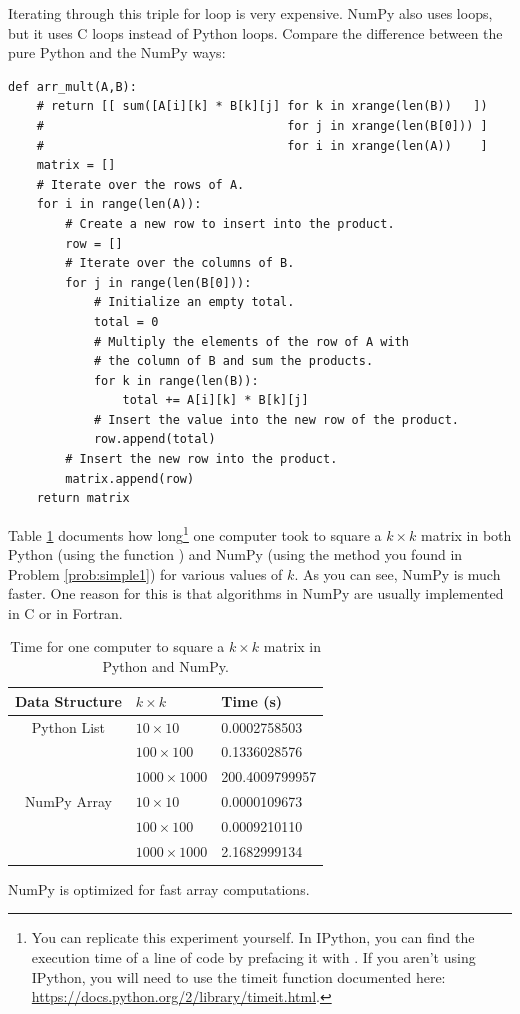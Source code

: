 Iterating through this triple for loop is very expensive.
NumPy also uses loops, but it uses C loops instead of Python loops.
Compare the difference between the pure Python and the NumPy ways:

\begin{lstlisting}
def arr_mult(A,B):
    # return [[ sum([A[i][k] * B[k][j] for k in xrange(len(B))   ]) 
    #                                  for j in xrange(len(B[0])) ]
    #                                  for i in xrange(len(A))    ]
    matrix = []
    # Iterate over the rows of A.
    for i in range(len(A)):
        # Create a new row to insert into the product.
        row = []
        # Iterate over the columns of B.
        for j in range(len(B[0])):
            # Initialize an empty total.
            total = 0
            # Multiply the elements of the row of A with 
            # the column of B and sum the products.
            for k in range(len(B)):
                total += A[i][k] * B[k][j]
            # Insert the value into the new row of the product. 
            row.append(total)
        # Insert the new row into the product.
        matrix.append(row)
    return matrix
\end{lstlisting}

Table \ref{table:square_times} documents how long\footnote{You can replicate this experiment yourself. In IPython, you can find the execution time of a line of code by prefacing it with .
If you aren't using IPython, you will need
to use the timeit function documented here: \url{https://docs.python.org/2/library/timeit.html}.}
one computer took to square a $k \times k$ matrix in both Python (using the function ) and NumPy (using the method you found in Problem \ref{prob:simple1}) for various values of $k$.
As you can see, NumPy is much faster.
One reason for this is that algorithms in NumPy are usually implemented in C or in Fortran.

\begin{table}
 \begin{tabular}{|c|l|l|} \hline Data Structure & $k\times k$ & Time (s) \\ \hline
 Python List    & $10\times10$  & 0.0002758503 \\
 \cline{2-3}    & $100\times100$    & 0.1336028576 \\
 \cline{2-3}    & $1000\times1000$ & 200.4009799957 \\
\hline \hline
 NumPy Array    & $10\times10$  & 0.0000109673 \\
 \cline{2-3}    & $100\times100$    & 0.0009210110 \\
 \cline{2-3}    & $1000\times1000$ & 2.1682999134 \\
 \hline \end{tabular}
 \caption{Time for one computer to square a $k \times k$ matrix in Python and NumPy.}
\label{table:square_times}
\end{table}
%
NumPy is optimized for fast array computations.

